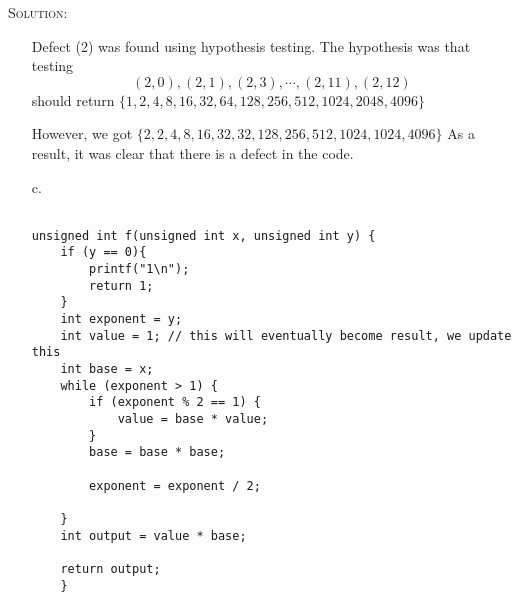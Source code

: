 \documentclass{exam}
\newenvironment{sol}{
  \medskip

  \textsc{Solution:}
}
{
  \medskip

}
\begin{document}
\begin{questions}
\begin{sol}
\begin{enumerate}
Defect (2) was found using hypothesis testing. The hypothesis was that testing $$(2,0), (2,1), (2,3), \cdots, (2,11), (2,12)$$ should return $\{ 1,
2,
4,
8,
16,
32,
64,
128,
256,
512,
1024,
2048,
4096\}$ 

However, we got $\{ 2,
2,
4,
8,
16,
32,
32,
128,
256,
512,
1024,
1024,
4096\}$ 
As a result, it was clear that there is a defect in the code.
\item[c.]

\begin{verbatim}

unsigned int f(unsigned int x, unsigned int y) {
    if (y == 0){
        printf("1\n");
        return 1;
    }
    int exponent = y;
    int value = 1; // this will eventually become result, we update this
    int base = x;
    while (exponent > 1) {
        if (exponent % 2 == 1) {
            value = base * value;
        }
        base = base * base;

        exponent = exponent / 2;

    }
    int output = value * base;

    return output;
    }
\end{verbatim}
\end{enumerate}
\end{sol}

\end{questions}
\end{document}
